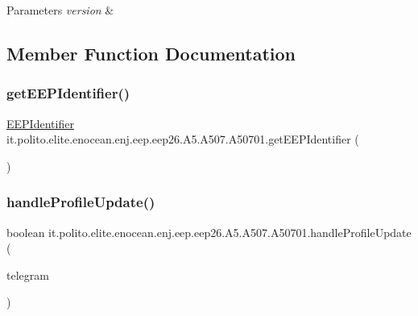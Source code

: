 \begin{DoxyParams}{Parameters}
{\em version} & \\
\hline
\end{DoxyParams}


\subsection{Member Function Documentation}
\hypertarget{classit_1_1polito_1_1elite_1_1enocean_1_1enj_1_1eep_1_1eep26_1_1_a5_1_1_a507_1_1_a50701_a1f4b9c054c5f7924944cc21f0790a2a6}{}\label{classit_1_1polito_1_1elite_1_1enocean_1_1enj_1_1eep_1_1eep26_1_1_a5_1_1_a507_1_1_a50701_a1f4b9c054c5f7924944cc21f0790a2a6} 
\subsubsection{\texorpdfstring{get\+E\+E\+P\+Identifier()}{getEEPIdentifier()}}
{\footnotesize\ttfamily \hyperlink{classit_1_1polito_1_1elite_1_1enocean_1_1enj_1_1eep_1_1_e_e_p_identifier}{E\+E\+P\+Identifier} it.\+polito.\+elite.\+enocean.\+enj.\+eep.\+eep26.\+A5.\+A507.\+A50701.\+get\+E\+E\+P\+Identifier (\begin{DoxyParamCaption}{ }\end{DoxyParamCaption})}

\hypertarget{classit_1_1polito_1_1elite_1_1enocean_1_1enj_1_1eep_1_1eep26_1_1_a5_1_1_a507_1_1_a50701_a0f2f57646a0e8d9d355717d6e08a966f}{}\label{classit_1_1polito_1_1elite_1_1enocean_1_1enj_1_1eep_1_1eep26_1_1_a5_1_1_a507_1_1_a50701_a0f2f57646a0e8d9d355717d6e08a966f} 
\subsubsection{\texorpdfstring{handle\+Profile\+Update()}{handleProfileUpdate()}}
{\footnotesize\ttfamily boolean it.\+polito.\+elite.\+enocean.\+enj.\+eep.\+eep26.\+A5.\+A507.\+A50701.\+handle\+Profile\+Update (\begin{DoxyParamCaption}\item[{\hyperlink{classit_1_1polito_1_1elite_1_1enocean_1_1enj_1_1eep_1_1eep26_1_1telegram_1_1_e_e_p26_telegram}{E\+E\+P26\+Telegram}}]{telegram }\end{DoxyParamCaption})}




